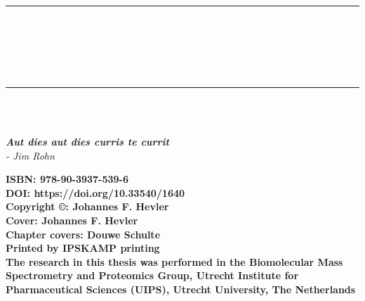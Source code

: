 \cleardoublepage
\pagestyle{empty} %
\frontmatter %
\begin{titlepage}
	\begin{center}
		\rule{\textwidth}{1.5pt}\\[0cm]
		{\huge \bfseries \thesistitle \par \ }\\[-0.5cm]
		\rule{\textwidth}{1.5pt}\\[2.5cm]
		{\large \bfseries\name}\\
		[2cm]
		\begin{small}
			\emph{\textbf{Aut dies aut dies curris te currit} \\
				- Jim Rohn}
		\end{small}
	\end{center}
	\clearpage
	\begin{flushleft}
		\vspace*{\fill}

		{\small \textbf{ISBN: 978-90-3937-539-6}\\
		\textbf{DOI: https://doi.org/10.33540/1640}\\
		[0.5cm]
		\textbf{Copyright ©: Johannes F. Hevler}\\
		\textbf{Cover: Johannes F. Hevler}\\
		\textbf{Chapter covers: Douwe Schulte}\\
		\textbf{Printed by IPSKAMP printing}\\
		[0.5cm]
		\textbf{The research in this thesis was performed in the Biomolecular Mass
			Spectrometry and Proteomics Group, Utrecht Institute for Pharmaceutical Sciences (UIPS), Utrecht University, The Netherlands}}

	\end{flushleft}
	\clearpage


\end{titlepage}
